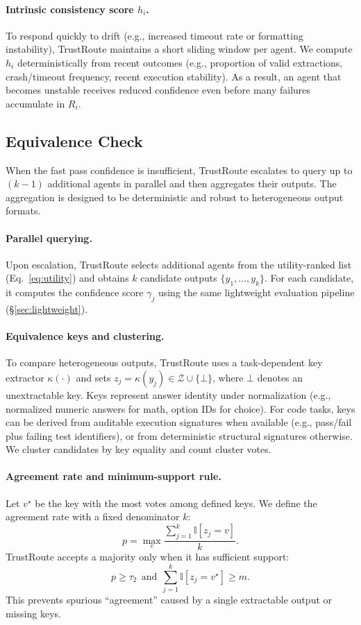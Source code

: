 \documentclass[acmsmall,screen,review,anonymous]{acmart}
\begin{document}
\paragraph{Intrinsic consistency score $h_i$.}
To respond quickly to drift (e.g., increased timeout rate or formatting instability), TrustRoute maintains a short sliding window per agent.
We compute $h_i$ deterministically from recent outcomes (e.g., proportion of valid extractions, crash/timeout frequency, recent execution stability).
As a result, an agent that becomes unstable receives reduced confidence even before many failures accumulate in $R_i$.

\subsection{Equivalence Check}
\label{sec:voting}
When the fast pass confidence is insufficient, TrustRoute escalates to query up to $(k-1)$ additional agents in parallel and then aggregates their outputs.
The aggregation is designed to be deterministic and robust to heterogeneous output formats.

\paragraph{Parallel querying.}
Upon escalation, TrustRoute selects additional agents from the utility-ranked list (Eq.~\ref{eq:utility}) and obtains $k$ candidate outputs $\{y_1,\ldots,y_k\}$.
For each candidate, it computes the confidence score $\gamma_j$ using the same lightweight evaluation pipeline (\S\ref{sec:lightweight}).

\paragraph{Equivalence keys and clustering.}
To compare heterogeneous outputs, TrustRoute uses a task-dependent key extractor $\kappa(\cdot)$ and sets
$z_j=\kappa(y_j)\in\mathcal{Z}\cup\{\bot\}$, where $\bot$ denotes an unextractable key.
Keys represent answer identity under normalization (e.g., normalized numeric answers for math, option IDs for choice).
For code tasks, keys can be derived from auditable execution signatures when available (e.g., pass/fail plus failing test identifiers), or from deterministic structural signatures otherwise.
We cluster candidates by key equality and count cluster votes.

\paragraph{Agreement rate and minimum-support rule.}
Let $v^\star$ be the key with the most votes among defined keys.
We define the agreement rate with a fixed denominator $k$:
\begin{equation}
p = \max_v \frac{\sum_{j=1}^{k}\mathbb{I}[z_j=v]}{k}.
\label{eq:agreement}
\end{equation}
TrustRoute accepts a majority only when it has sufficient support:
\begin{equation}
p \ge \tau_2 \ \ \text{and}\ \ \sum_{j=1}^{k}\mathbb{I}[z_j=v^\star]\ge m.
\label{eq:min_support}
\end{equation}
This prevents spurious ``agreement'' caused by a single extractable output or missing keys.
\end{document}
